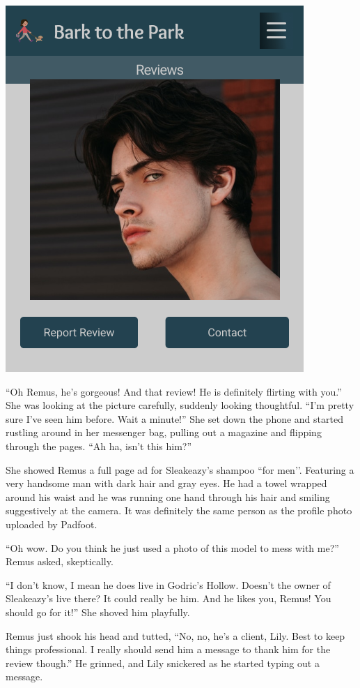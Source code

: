 \documentclass[12pt,twoside,openright]{memoir}
\begin{document}
{\hfill\includegraphics[height=\textheight]{photo overlay}\hfill}

``Oh Remus, he's gorgeous! And that review! He is definitely flirting with you.'' She was looking at the picture carefully, suddenly looking thoughtful. ``I'm pretty sure I've seen him before. Wait a minute!'' She set down the phone and started rustling around in her messenger bag, pulling out a magazine and flipping through the pages. ``Ah ha, isn't this him?''

She showed Remus a full page ad for Sleakeazy's shampoo ``for men'{}'. Featuring a very handsome man with dark hair and gray eyes. He had a towel wrapped around his waist and he was running one hand through his hair and smiling suggestively at the camera. It was definitely the same person as the profile photo uploaded by Padfoot.

``Oh wow. Do you think he just used a photo of this model to mess with me?'' Remus asked, skeptically.

``I don't know, I mean he does live in Godric's Hollow. Doesn't the owner of Sleakeazy's live there? It could really be him. And he likes you, Remus! You should go for it!'' She shoved him playfully. 

Remus just shook his head and tutted, ``No, no, he's a client, Lily. Best to keep things professional. I really should send him a message to thank him for the review though.'' He grinned, and Lily snickered as he started typing out a message.
\end{document}
